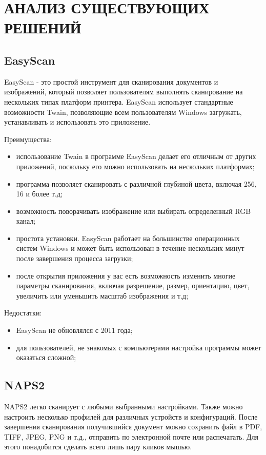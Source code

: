\section{АНАЛИЗ СУЩЕСТВУЮЩИХ РЕШЕНИЙ}
\label{sec:solution}

\subsection{EasyScan}
EasyScan - это простой инструмент для сканирования документов и изображений, который позволяет пользователям выполнять сканирование на нескольких типах платформ принтера. EasyScan использует стандартные возможности Twain, позволяющие всем пользователям Windows загружать, устанавливать и использовать это приложение. 


Преимущества:
\begin{itemize}
	\item использование Twain в программе EasyScan делает его отличным от других приложений, поскольку его можно использовать на нескольких платформах;
	\item программа позволяет сканировать с различной глубиной цвета, включая 256, 16 и более т.д; 
	\item возможность поворачивать изображение или выбирать определенный RGB канал; 
	\item простота установки. EasyScan работает на большинстве операционных систем Windows и может быть использован в течение нескольких минут после завершения процесса загрузки; 
	\item после открытия приложения у вас есть возможность изменить многие параметры сканирования, включая разрешение, размер, ориентацию, цвет, увеличить или уменьшить масштаб изображения и т.д;
\end{itemize}

Недостатки:
\begin{itemize}
	\item EasyScan не обновлялся с 2011 года;
	\item для пользователей, не знакомых с компьютерами настройка программы может оказаться сложной;
\end{itemize}

\subsection{NAPS2} 
NAPS2 легко сканирует с любыми выбранными настройками. Также можно настроить несколько профилей для различных устройств и конфигураций. После завершения сканирования получившийся документ можно сохранить файл в PDF, TIFF, JPEG, PNG и т.д., отправить по электронной почте или распечатать. Для этого понадобится сделать всего лишь пару кликов мышью.


